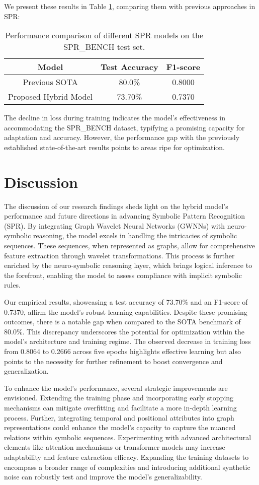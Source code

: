 \documentclass{article}
\begin{document}
We present these results in Table \ref{tab:results}, comparing them with previous approaches in SPR:

\begin{table}[h]
    \centering
    \begin{tabular}{|c|c|c|}
    \hline
    \textbf{Model} & \textbf{Test Accuracy} & \textbf{F1-score} \\
    \hline
    Previous SOTA & 80.0\% & 0.8000 \\ 
    Proposed Hybrid Model & 73.70\% & 0.7370 \\
    \hline
    \end{tabular}
    \caption{Performance comparison of different SPR models on the SPR_BENCH test set.}
    \label{tab:results}
\end{table}

The decline in loss during training indicates the model's effectiveness in accommodating the SPR_BENCH dataset, typifying a promising capacity for adaptation and accuracy. However, the performance gap with the previously established state-of-the-art results points to areas ripe for optimization.
\section{Discussion}
The discussion of our research findings sheds light on the hybrid model's performance and future directions in advancing Symbolic Pattern Recognition (SPR). By integrating Graph Wavelet Neural Networks (GWNNs) with neuro-symbolic reasoning, the model excels in handling the intricacies of symbolic sequences. These sequences, when represented as graphs, allow for comprehensive feature extraction through wavelet transformations. This process is further enriched by the neuro-symbolic reasoning layer, which brings logical inference to the forefront, enabling the model to assess compliance with implicit symbolic rules.

Our empirical results, showcasing a test accuracy of 73.70\% and an F1-score of 0.7370, affirm the model's robust learning capabilities. Despite these promising outcomes, there is a notable gap when compared to the SOTA benchmark of 80.0\%. This discrepancy underscores the potential for optimization within the model's architecture and training regime. The observed decrease in training loss from 0.8064 to 0.2666 across five epochs highlights effective learning but also points to the necessity for further refinement to boost convergence and generalization.

To enhance the model's performance, several strategic improvements are envisioned. Extending the training phase and incorporating early stopping mechanisms can mitigate overfitting and facilitate a more in-depth learning process. Further, integrating temporal and positional attributes into graph representations could enhance the model's capacity to capture the nuanced relations within symbolic sequences. Experimenting with advanced architectural elements like attention mechanisms or transformer models may increase adaptability and feature extraction efficacy. Expanding the training datasets to encompass a broader range of complexities and introducing additional synthetic noise can robustly test and improve the model's generalizability.
\end{document}
